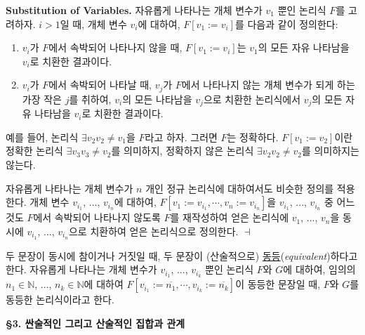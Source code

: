 \documentclass[12pt]{paper}
\newenvironment{context}[1][]
{ \noindent \textbf{{#1}.} }
{ \hfill $ \dashv $ }
\begin{document}
\begin{context}[Substitution of Variables]
자유롭게 나타나는 개체 변수가 $v_{1}$ 뿐인 논리식 $F$를 고려하자.
$i > 1$일 때, 개체 변수 $v_{i}$에 대하여, $F \left[ v_{1} := v_{i} \right]$를 다음과 같이 정의한다:
\begin{enumerate}
\item $v_{i}$가 $F$에서 속박되어 나타나지 않을 때, $F \left[ v_{1} := v_{i} \right]$는 $v_{1}$의 모든 자유 나타남을 $v_{i}$로 치환한 결과이다.
\item $v_{i}$가 $F$에서 속박되어 나타날 때, $v_{j}$가 $F$에서 나타나지 않는 개체 변수가 되게 하는 가장 작은 $j$를 취하여,
$v_{i}$의 모든 나타남을 $v_{j}$으로 치환한 논리식에서 $v_{j}$의 모든 자유 나타남을 $v_{i}$로 치환한 결과이다.
\end{enumerate}

예를 들어, 논리식 $\exists v_{2} v_{2} \neq v_{1}$을 $F$라고 하자.
그러면 $F$는 정확하다.
$F \left[ v_{1} := v_{2} \right]$이란 정확한 논리식 $\exists v_{3} v_{3} \neq v_{2}$를 의미하지, 정확하지 않은 논리식 $\exists v_{2} v_{2} \neq v_{2}$를 의미하지는 않는다.

자유롭게 나타나는 개체 변수가 $n$ 개인 정규 논리식에 대하여서도 비슷한 정의를 적용한다.
개체 변수 $v_{i_{1}}$, ..., $v_{i_{n}}$에 대하여,
$F \left[ v_{1} := v_{i_{1}} , \cdots , v_{n} := v_{i_{n}} \right]$을
$v_{i_{1}}$, ..., $v_{i_{n}}$ 중 어느 것도 $F$에서 속박되어 나타나지 않도록 $F$를 재작성하여 얻은 논리식에
$v_{1}$, ..., $v_{n}$을 동시에 $v_{i_{1}}$, ..., $v_{i_{n}}$으로 치환하여 얻은 논리식으로 정의한다. 
\end{context}

두 문장이 동시에 참이거나 거짓일 때, 두 문장이 (산술적으로) \underline{동등}(\textit{equivalent})하다고 한다.
자유롭게 나타나는 개체 변수가 $v_{i_{1}}$, ..., $v_{i_{k}}$ 뿐인 논리식 $F$와 $G$에 대하여,
임의의 $n_{1} \in \mathbb{N}$, ..., $n_{k} \in \mathbb{N}$에 대하여 $F \left[ v_{i_{1}} := \overline{n_{1}} , \cdots , v_{i_{k}} := \overline{n_{k}} \right]$이 동등한 문장일 때,
$F$와 $G$를 동등한 논리식이라고 한다.

\noindent \textbf{\S3. 싼술적인 그리고 산술적인 집합과 관계}
\end{document}

